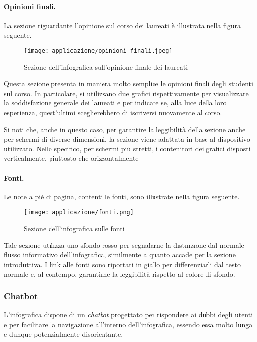 \paragraph{Opinioni finali.} La sezione riguardante l'opinione sul corso dei laureati è illustrata nella figura seguente. 
\begin{figure}[H] 
    \centering 
    \texttt{[image: applicazione/opinioni\_finali.jpeg]} 
    \caption{Sezione dell'infografica sull'opinione finale dei laureati}
    \label{fig:opinioni_finali}
\end{figure}
Questa sezione presenta in maniera molto semplice le opinioni finali degli studenti sul corso. In particolare, si utilizzano due grafici rispettivamente per visualizzare la soddisfazione 
generale dei laureati e per indicare se, alla luce della loro esperienza, quest'ultimi sceglierebbero di iscriversi nuovamente al corso.

\bigskip
\noindent Si noti che, anche in questo caso, per garantire la leggibilità della sezione anche per schermi di diverse dimensioni, la sezione viene adattata 
in base al dispositivo utilizzato. Nello specifico, per schermi più stretti, i contenitori dei grafici disposti verticalmente, piuttosto che orizzontalmente

\paragraph{Fonti.} Le note a piè di pagina, contenti le fonti, sono illustrate nella figura seguente. 
\begin{figure}[H] 
    \centering 
    \texttt{[image: applicazione/fonti.png]} 
    \caption{Sezione dell'infografica sulle fonti}
    \label{fig:app_fonti}
\end{figure}
Tale sezione utilizza uno sfondo rosso per segnalarne la distinzione dal normale flusso informativo dell'infografica, similmente a quanto accade per la sezione introduttiva. 
I link alle fonti sono riportati in giallo per differenziarli dal testo normale e, al contempo, garantirne la leggibilità rispetto al colore di sfondo.

\subsubsection{Chatbot}\label{subsubsec:chatbot}
L'infografica dispone di un \emph{chatbot} progettato per rispondere ai dubbi degli utenti e per facilitare la navigazione all'interno dell'infografica, 
essendo essa molto lunga e dunque potenzialmente disorientante.

